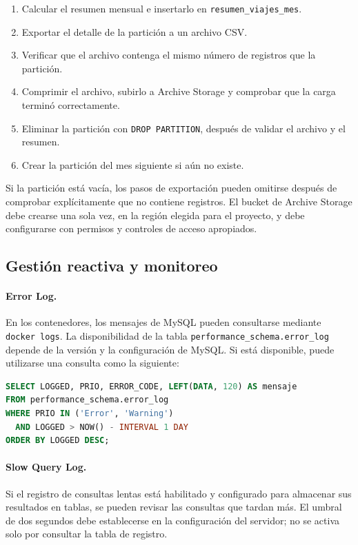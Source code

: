 \documentclass[10pt,a4paper]{article}
\begin{document}
\begin{enumerate}
    \item Calcular el resumen mensual e insertarlo en \texttt{resumen\_viajes\_mes}.
    \item Exportar el detalle de la partición a un archivo CSV.
    \item Verificar que el archivo contenga el mismo número de registros que la partición.
    \item Comprimir el archivo, subirlo a Archive Storage y comprobar que la carga terminó correctamente.
    \item Eliminar la partición con \texttt{DROP PARTITION}, después de validar el archivo y el resumen.
    \item Crear la partición del mes siguiente si aún no existe.
\end{enumerate}

Si la partición está vacía, los pasos de exportación pueden omitirse después de comprobar explícitamente que no contiene registros. El bucket de Archive Storage debe crearse una sola vez, en la región elegida para el proyecto, y debe configurarse con permisos y controles de acceso apropiados.

\subsection{Gestión reactiva y monitoreo}

\paragraph{Error Log.}
En los contenedores, los mensajes de MySQL pueden consultarse mediante \texttt{docker logs}. La disponibilidad de la tabla \texttt{performance\_schema.error\_log} depende de la versión y la configuración de MySQL. Si está disponible, puede utilizarse una consulta como la siguiente:

\begin{lstlisting}[language=SQL, caption={Consulta ilustrativa de errores y advertencias}]
SELECT LOGGED, PRIO, ERROR_CODE, LEFT(DATA, 120) AS mensaje
FROM performance_schema.error_log
WHERE PRIO IN ('Error', 'Warning')
  AND LOGGED > NOW() - INTERVAL 1 DAY
ORDER BY LOGGED DESC;
\end{lstlisting}

\paragraph{Slow Query Log.}
Si el registro de consultas lentas está habilitado y configurado para almacenar sus resultados en tablas, se pueden revisar las consultas que tardan más. El umbral de dos segundos debe establecerse en la configuración del servidor; no se activa solo por consultar la tabla de registro.
\end{document}
